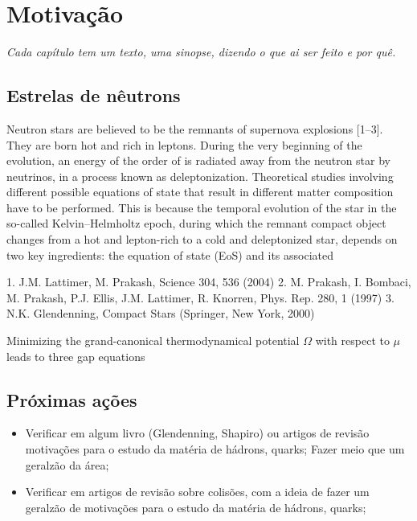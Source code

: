 \chapter{Motivação}

\begin{fullwidth}\it
Cada capítulo tem um texto, uma sinopse, dizendo o que ai ser feito e por quê.
\end{fullwidth}

\section{Estrelas de nêutrons}

Neutron stars are believed to be the remnants of supernova
explosions [1–3]. They are born hot and rich in leptons. During
the very beginning of the evolution, an energy of the order
of  is radiated away from the neutron star by
neutrinos, in a process known as deleptonization. Theoretical
studies involving different possible equations of state
that result in different matter composition have to be performed.
This is because the temporal evolution of the star
in the so-called Kelvin–Helmholtz epoch, during which the
remnant compact object changes from a hot and lepton-rich
to a cold and deleptonized star, depends on two key ingredients:
the equation of state (EoS) and its associated

1. J.M. Lattimer, M. Prakash, Science 304, 536 (2004)
2. M. Prakash, I. Bombaci, M. Prakash, P.J. Ellis, J.M. Lattimer,
R. Knorren, Phys. Rep. 280, 1 (1997)
3. N.K. Glendenning, Compact Stars (Springer, New York, 2000)

Minimizing the grand-canonical thermodynamical potential
$\Omega$ with respect to $\mu$ leads to three gap equations

\section{Próximas ações}

\begin{itemize}
	\item Verificar em algum livro (Glendenning, Shapiro) ou artigos de revisão motivações para o estudo da matéria de hádrons, quarks; Fazer meio que um geralzão da área;
	\item Verificar em artigos de revisão sobre colisões, com a ideia de fazer um geralzão de motivações para o estudo da matéria de hádrons, quarks;
\end{itemize}
